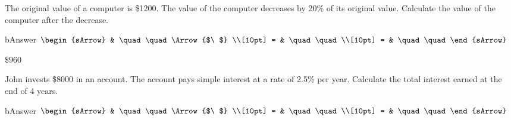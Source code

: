 \begin{mtask}[resume]
  \task  The original value of a computer is \$1200. The value of the computer decreases by 20\% of its original value. Calculate the value of the computer after the decrease.
      \begin{envOut}[height=6cm]{bAnswer}
	       $\begin{sArrow}
	             & \quad\quad       \Arrow{$\ $} \\[10pt]
               = & \quad\quad               \\[10pt]      
			   = & \quad\quad  
	        \end{sArrow}$
      \end{envOut}
	  \begin{shortsolution}  
	     $\$960$
 	  \end{shortsolution}


  \task  John invests \$8000 in an account. The account pays simple interest at a rate of 2.5\% per year. Calculate the total interest earned at the end of 4 years.
      \begin{envOut}[height=6cm]{bAnswer}
	       $\begin{sArrow}
	             & \quad\quad       \Arrow{$\ $} \\[10pt]
               = & \quad\quad               \\[10pt]      
			   = & \quad\quad  
	        \end{sArrow}$
      \end{envOut}
	  \begin{shortsolution}  
	     $ \quad \quad \quad \quad$
 	  \end{shortsolution}


\end{mtask}

